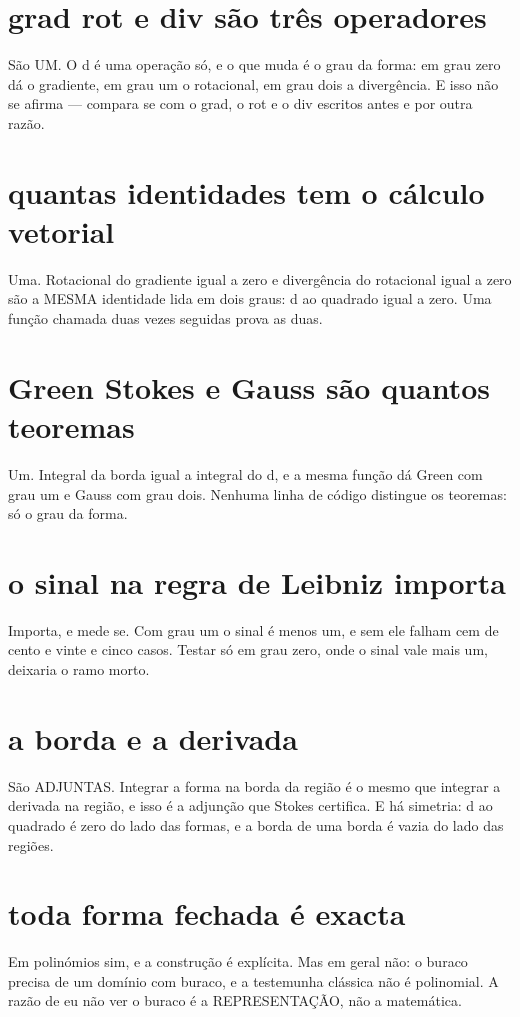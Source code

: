 \documentclass[11pt,a4paper]{article}
\begin{document}
\section{grad rot e div são três operadores}
São UM. O d é uma operação só, e o que muda é o grau da forma: em grau zero dá o
gradiente, em grau um o rotacional, em grau dois a divergência. E isso não se afirma —
compara se com o grad, o rot e o div escritos antes e por outra razão.

\section{quantas identidades tem o cálculo vetorial}
Uma. Rotacional do gradiente igual a zero e divergência do rotacional igual a zero são a
MESMA identidade lida em dois graus: d ao quadrado igual a zero. Uma função chamada duas
vezes seguidas prova as duas.

\section{Green Stokes e Gauss são quantos teoremas}
Um. Integral da borda igual a integral do d, e a mesma função dá Green com grau um e
Gauss com grau dois. Nenhuma linha de código distingue os teoremas: só o grau da forma.

\section{o sinal na regra de Leibniz importa}
Importa, e mede se. Com grau um o sinal é menos um, e sem ele falham cem de cento e vinte
e cinco casos. Testar só em grau zero, onde o sinal vale mais um, deixaria o ramo morto.

\section{a borda e a derivada}
São ADJUNTAS. Integrar a forma na borda da região é o mesmo que integrar a derivada na
região, e isso é a adjunção que Stokes certifica. E há simetria: d ao quadrado é zero do
lado das formas, e a borda de uma borda é vazia do lado das regiões.

\section{toda forma fechada é exacta}
Em polinómios sim, e a construção é explícita. Mas em geral não: o buraco precisa de um
domínio com buraco, e a testemunha clássica não é polinomial. A razão de eu não ver o
buraco é a REPRESENTAÇÃO, não a matemática.
\end{document}
